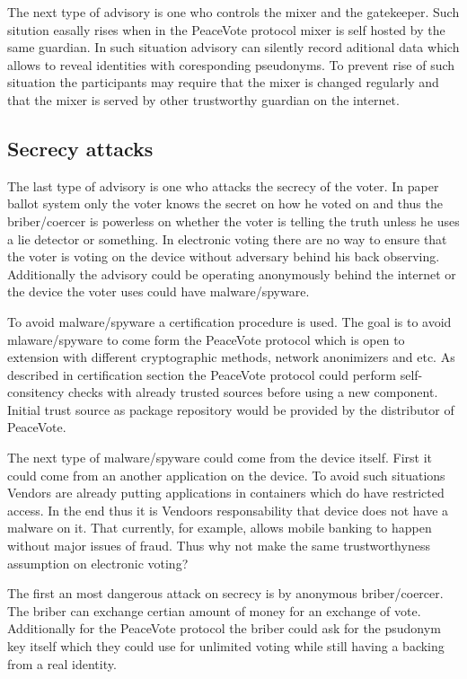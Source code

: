 \documentclass{article}
\begin{document}
The next type of advisory is one who controls the mixer and the gatekeeper. Such sitution easally rises when in the PeaceVote protocol mixer is self hosted by the same guardian. In such situation advisory can silently record aditional data which allows to reveal identities with coresponding pseudonyms. To prevent rise of such situation the participants may require that the mixer is changed regularly and that the mixer is served by other trustworthy guardian on the internet.

\subsection{Secrecy attacks}

The last type of advisory is one who attacks the secrecy of the voter. In paper ballot system only the voter knows the secret on how he voted on and thus the briber/coercer is powerless on whether the voter is telling the truth unless he uses a lie detector or something. In electronic voting there are no way to ensure that the voter is voting on the device without adversary behind his back observing. Additionally the advisory could be operating anonymously behind the internet or the device the voter uses could have malware/spyware. 

To avoid malware/spyware a certification procedure is used. The goal is to avoid mlaware/spyware to come form the PeaceVote protocol which is open to extension with different cryptographic methods, network anonimizers and etc. As described in certification section the PeaceVote protocol could perform self-consitency checks with already trusted sources before using a new component. Initial trust source as package repository would be provided by the distributor of PeaceVote.

The next type of malware/spyware could come from the device itself. First it could come from an another application on the device. To avoid such situations Vendors are already putting applications in containers which do have restricted access. In the end thus it is Vendoors responsability that device does not have a malware on it. That currently, for example, allows mobile banking to happen without major issues of fraud. Thus why not make the same trustworthyness assumption on electronic voting?

The first an most dangerous attack on secrecy is by anonymous briber/coercer. The briber can exchange certian amount of money for an exchange of vote. Additionally for the PeaceVote protocol the briber could ask for the psudonym key itself which they could use for unlimited voting while still having a backing from a real identity.
\end{document}
